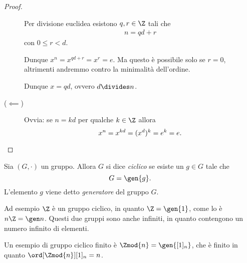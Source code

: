 \begin{proof}
\begin{description}
        Per divisione euclidea esistono $q, r \in \Z$ tali che \begin{align*}
            n = qd + r
        \end{align*} con $0 \leq r < d$.

        Dunque $x^n = x^{qd+r} = x^r = e$. Ma questo è possibile solo se $r = 0$, altrimenti andremmo contro la minimalità dell'ordine.
        
        Dunque $x = qd$, ovvero $d \divides n$.
        \item[($\impliedby$)] Ovvia: se $n = kd$ per qualche $k \in \Z$ allora \[
            x^n = x^{kd} = (x^d)^k = e^k = e.\qedhere    
        \]
    \end{description}
\end{proof}

\begin{definition}
    \label{def:grp_ciclico}
    Sia $(G, \cdot)$ un gruppo. 
    Allora $G$ si dice \emph{ciclico} se esiste un $g \in G$ tale che \[
        G = \gen{g}.    
    \]
    L'elemento $g$ viene detto \emph{generatore} del gruppo $G$.
\end{definition}

Ad esempio $\Z$ è un gruppo ciclico, in quanto $\Z = \gen{1}$, come lo è $n\Z = \gen n$. Questi due gruppi sono anche infiniti, in quanto contengono un numero infinito di elementi.

Un esempio di gruppo ciclico finito è $\Zmod{n} = \gen{[1]_n}$, che è finito in quanto $\ord[\Zmod{n}]{[1]_n} = n$.

